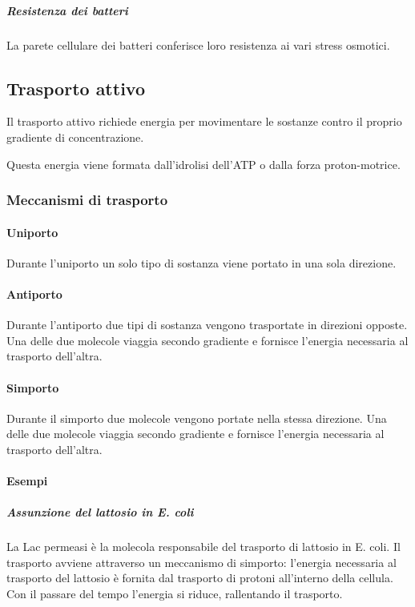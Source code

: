 				\subparagraph{Resistenza dei batteri}
				La parete cellulare dei batteri conferisce loro resistenza ai vari stress osmotici.

	\subsection{Trasporto attivo}
	Il trasporto attivo richiede energia per movimentare le sostanze contro il proprio gradiente di concentrazione. 

	Questa energia viene formata dall'idrolisi dell'ATP o dalla forza proton-motrice. 

		
		\subsubsection{Meccanismi di trasporto}

			\paragraph{Uniporto}
			Durante l'uniporto un solo tipo di sostanza viene portato in una sola direzione.

			\paragraph{Antiporto}
			Durante l'antiporto due tipi di sostanza vengono trasportate in direzioni opposte.
			Una delle due molecole viaggia secondo gradiente e fornisce l'energia necessaria al trasporto dell'altra.

			\paragraph{Simporto}
			Durante il simporto due molecole vengono portate nella stessa direzione.
			Una delle due molecole viaggia secondo gradiente e fornisce l'energia necessaria al trasporto dell'altra.

			\paragraph{Esempi}

				\subparagraph{Assunzione del lattosio in E. coli}
				La Lac permeasi \`e la molecola responsabile del trasporto di lattosio in E. coli.
				Il trasporto avviene attraverso un meccanismo di simporto: l'energia necessaria al trasporto del lattosio \`e fornita dal trasporto di protoni all'interno della cellula.
				Con il passare del tempo l'energia si riduce, rallentando il trasporto.

